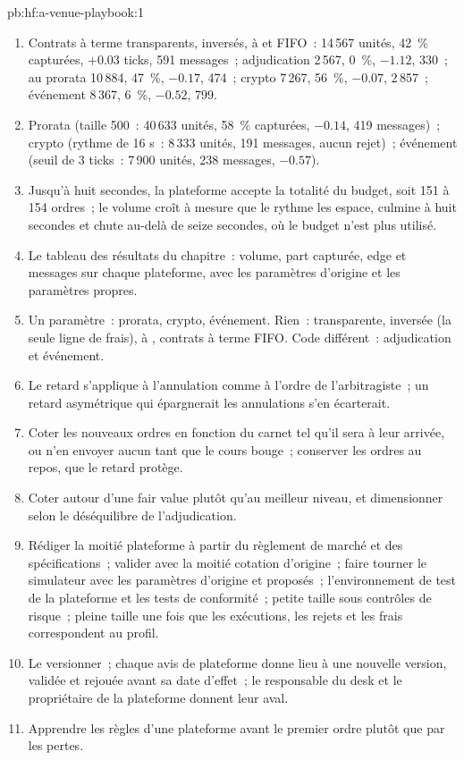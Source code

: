 \begin{solution}{pb:hf:a-venue-playbook:1}
\begin{enumerate}
\item Contrats à terme transparents, inversés, à  et FIFO~: 14\,567 unités, 42~\% capturées, $+0.03$ ticks, 591 messages~; adjudication 2\,567, 0~\%, $-1.12$, 330~; au prorata
10\,884, 47~\%, $-0.17$, 474~; crypto 7\,267, 56~\%, $-0.07$, 2\,857~; événement 8\,367, 6~\%, $-0.52$, 799.
\item Prorata (taille 500~: 40\,633 unités, 58~\% capturées, $-0.14$, 419 messages)~; crypto (rythme de 16 s~: 8\,333 unités, 191 messages, aucun rejet)~;
événement (seuil de 3 ticks~: 7\,900 unités, 238 messages, $-0.57$).
\item Jusqu'à huit secondes, la plateforme accepte la totalité du budget, soit 151 à 154 ordres~; le volume croît à mesure que le rythme les espace, culmine à huit secondes et chute
au-delà de seize secondes, où le budget n'est plus utilisé.
\item Le tableau des résultats du chapitre~: volume, part capturée, edge et messages sur chaque plateforme, avec les paramètres d'origine et les paramètres propres.
\item Un paramètre~: prorata, crypto, événement. Rien~: transparente, inversée (la seule ligne de frais), à , contrats à terme FIFO. Code différent~: adjudication et événement.
\item Le retard s'applique à l'annulation comme à l'ordre de l'arbitragiste~; un retard asymétrique qui épargnerait les annulations s'en écarterait.
\item Coter les nouveaux ordres en fonction du carnet tel qu'il sera à leur arrivée, ou n'en envoyer aucun tant que le cours bouge~; conserver les ordres au repos, que le retard
protège.
\item Coter autour d'une fair value plutôt qu'au meilleur niveau, et dimensionner selon le déséquilibre de l'adjudication.
\item Rédiger la moitié plateforme à partir du règlement de marché et des spécifications~; valider avec la moitié cotation d'origine~; faire tourner le simulateur avec les paramètres d'origine et
proposés~; l'environnement de test de la plateforme et les tests de conformité~; petite taille sous contrôles de risque~; pleine taille une fois que les exécutions, les rejets et les frais correspondent au
profil.
\item Le versionner~; chaque avis de plateforme donne lieu à une nouvelle version, validée et rejouée avant sa date d'effet~; le responsable du desk et le propriétaire de la plateforme donnent leur aval.
\item Apprendre les règles d'une plateforme avant le premier ordre plutôt que par les pertes.
\end{enumerate}
\end{solution}

